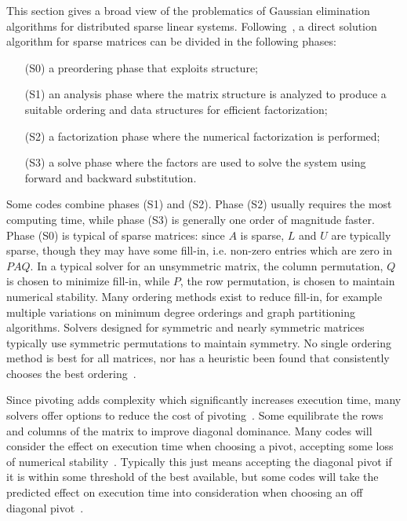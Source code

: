 \documentclass[acmtocl]{acmtrans2m}
\begin{document}
This section gives a broad view of the problematics of Gaussian elimination
algorithms for distributed sparse linear systems. 
Following~\cite[Chapter 6]{dongarra98numerical}, a direct solution algorithm
for sparse matrices can be divided in the following phases:
\begin{itemize}
\item[(S0)] a preordering phase that exploits structure;
\item[(S1)] an analysis phase where the matrix structure is analyzed to produce a
suitable ordering and data structures for efficient factorization;
\item[(S2)] a factorization phase where the numerical factorization is performed;
\item[(S3)] a solve phase where the factors are used to solve the system using
forward and backward substitution.
\end{itemize}
Some codes combine phases (S1) and (S2). Phase (S2) usually requires the most
computing time, while phase (S3) is generally one order of magnitude faster.
Phase (S0) is typical of sparse matrices:
since $A$ is sparse, $L$ and $U$ are typically sparse, though they may have some
fill-in, i.e. non-zero entries which are zero in $PAQ$.  
In a typical solver for an unsymmetric matrix, the column permutation,
$Q$ is chosen to minimize fill-in, while $P$, the row permutation, is
chosen to maintain numerical stability.  
Many ordering methods exist to reduce fill-in, for example multiple variations
on minimum degree orderings and graph partitioning algorithms.  Solvers
designed for symmetric and nearly symmetric matrices typically use symmetric
permutations to maintain symmetry.  No single ordering method is best for all
matrices, nor has a heuristic been found that consistently chooses the best
ordering~\cite{BaumannFleischmannMutzbauer03,AmestoyDavisDuff03}. 

Since pivoting adds complexity which significantly increases execution
time, many solvers offer options to reduce the cost of pivoting~\cite{LiDemmel509092,sg:04-fgcs}.  Some
equilibrate the rows and columns of the matrix to improve diagonal
dominance.  Many codes will consider the effect on execution time when
choosing a pivot, accepting some loss of numerical stability~\cite{Malard126136}.
Typically this just means accepting the diagonal pivot if it is within
some threshold of the best available, but some codes will take the
predicted effect on execution time into consideration when choosing an off
diagonal pivot~\cite{Davis992205}.
\end{document}
